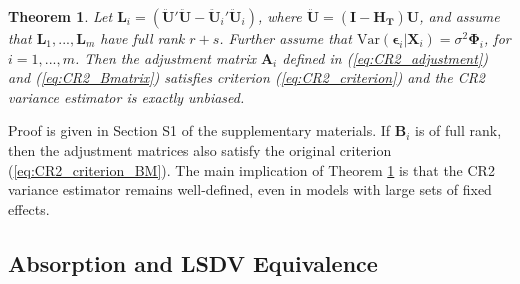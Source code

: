\documentclass[12pt]{article}\usepackage[]{graphicx}\usepackage[]{color}
\newtheorem{thm}{Theorem}
\newcommand{\Var}{\text{Var}}
\newcommand{\bm}{\mathbf}
\newcommand{\bs}{\boldsymbol}
\begin{document}
\begin{thm}
\label{thm:BRL_FE}
Let $\bm{L}_i = \left(\bm{\ddot{U}}'\bm{\ddot{U}} - \bm{\ddot{U}}_i'\bm{\ddot{U}}_i\right)$, where $\bm{\ddot{U}} = \left(\bm{I} - \bm{H_T}\right)\bm{U}$, and assume that $\bm{L}_1,...,\bm{L}_m$ have full rank $r + s$. Further assume that $\Var\left(\bs\epsilon_i\left|\bm{X}_i\right.\right) = \sigma^2 \bs\Phi_i$, for $i = 1,...,m$. Then the adjustment matrix $\bm{A}_i$ defined in (\ref{eq:CR2_adjustment}) and (\ref{eq:CR2_Bmatrix}) satisfies criterion (\ref{eq:CR2_criterion}) and the CR2 variance estimator is exactly unbiased.
\end{thm}

Proof is given in Section S1 of the supplementary materials. If $\bm{B}_i$ is of full rank, then the adjustment matrices also satisfy the original criterion (\ref{eq:CR2_criterion_BM}). The main implication of Theorem \ref{thm:BRL_FE} is that the CR2 variance estimator remains well-defined, even in models with large sets of fixed effects.

\subsection{Absorption and LSDV Equivalence}
\end{document}
